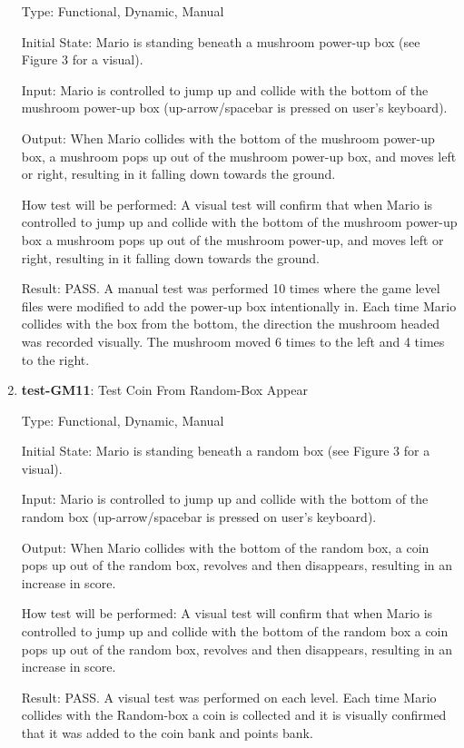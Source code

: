 \documentclass[12pt, titlepage]{article}
\begin{document}
\begin{enumerate}
Type: Functional, Dynamic, Manual

Initial State: Mario is standing beneath a mushroom power-up box (see Figure 3 for a visual).
					
Input: Mario is controlled to jump up and collide with the bottom of the mushroom power-up box (up-arrow/spacebar is pressed on user's keyboard).
					
Output: When Mario collides with the bottom of the mushroom power-up box, a mushroom pops up out of the mushroom power-up box, and moves left or right, resulting in it falling down towards the ground.
					
How test will be performed: A visual test will confirm that when Mario is controlled to jump up and collide with the bottom of the mushroom power-up box a mushroom pops up out of the mushroom power-up, and moves left or right, resulting in it falling down towards the ground.

Result: PASS. A manual test was performed 10 times where the game level files were modified to add the power-up box intentionally in. Each time Mario collides with the box from the bottom, the direction the mushroom headed was recorded visually. The mushroom moved 6 times to the left and 4 times to the right. 

\item{\textbf{test-GM11}: Test Coin From Random-Box Appear\\}

Type: Functional, Dynamic, Manual

Initial State: Mario is standing beneath a random box (see Figure 3 for a visual).

Input: Mario is controlled to jump up and collide with the bottom of the random box (up-arrow/spacebar is pressed on user's keyboard).
					
Output: When Mario collides with the bottom of the random box, a coin pops up out of the random box, revolves and then disappears, resulting in an increase in score.
					
How test will be performed: A visual test will confirm that when Mario is controlled to jump up and collide with the bottom of the random box a coin pops up out of the random box, revolves and then disappears, resulting in an increase in score.

Result: PASS. A visual test was performed on each level. Each time Mario collides with the Random-box a coin is collected and it is visually confirmed that it was added to the coin bank and points bank.


\end{enumerate}
\end{document}
